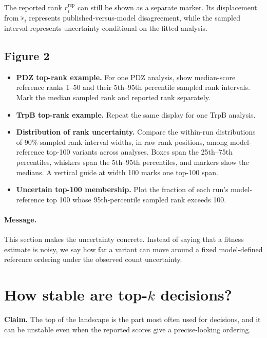 \documentclass[11pt]{article}
\begin{document}
The reported rank $r_i^{\mathrm{rep}}$ can still be shown as a separate marker. Its displacement from $\widetilde r_i$ represents published-versus-model disagreement, while the sampled interval represents uncertainty conditional on the fitted analysis.

\subsection*{Figure 2}

\begin{itemize}
  \item[\textbf{(a)}] \textbf{PDZ top-rank example.} For one PDZ analysis, show median-score reference ranks 1--50 and their 5th--95th percentile sampled rank intervals. Mark the median sampled rank and reported rank separately.
  \item[\textbf{(b)}] \textbf{TrpB top-rank example.} Repeat the same display for one TrpB analysis.
  \item[\textbf{(c)}] \textbf{Distribution of rank uncertainty.} Compare the within-run distributions of 90\% sampled rank interval widths, in raw rank positions, among model-reference top-100 variants across analyses. Boxes span the 25th--75th percentiles, whiskers span the 5th--95th percentiles, and markers show the medians. A vertical guide at width 100 marks one top-100 span.
  \item[\textbf{(d)}] \textbf{Uncertain top-100 membership.} Plot the fraction of each run's model-reference top 100 whose 95th-percentile sampled rank exceeds 100.
\end{itemize}

\paragraph{Message.}
This section makes the uncertainty concrete. Instead of saying that a fitness estimate is noisy, we say how far a variant can move around a fixed model-defined reference ordering under the observed count uncertainty.

\section{How stable are top-\texorpdfstring{$k$}{k} decisions?}

\begin{callout}
\textbf{Claim.}
The top of the landscape is the part most often used for decisions, and it can be unstable even when the reported scores give a precise-looking ordering.
\end{callout}
\end{document}
